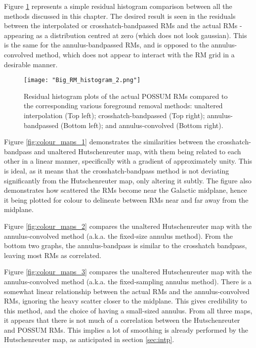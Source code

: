 Figure \ref{fig:big_hist} represents a simple residual histogram comparison between all the methods discussed in this chapter. The desired result is seen in the residuals between the interpolated or crosshatch-bandpassed RMs and the actual RMs - appearing as a distribution centred at zero (which does not look gaussian). This is the same for the annulus-bandpassed RMs, and is opposed to the annulus-convolved method, which does not appear to interact with the RM grid in a desirable manner.

\begin{figure}
    \texttt{[image: "Big\_RM\_histogram\_2.png"]}
    \centering
    \caption{Residual histogram plots of the actual POSSUM RMs compared to the corresponding various foreground removal methods: unaltered interpolation (Top left); crosshatch-bandpassed (Top right); annulus-bandpassed (Bottom left); and annulus-convolved (Bottom right).}
    \label{fig:big_hist}
\end{figure}


Figure \ref{fig:colour_maps_1} demonstrates the similarities between the crosshatch-bandpass and unaltered Hutschenreuter map, with them being related to each other in a linear manner, specifically with a gradient of approximately unity. This is ideal, as it means that the crosshatch-bandpass method is not deviating significantly from the Hutschenreuter map, only altering it subtly. The figure also demonstrates how scattered the RMs become near the Galactic midplane, hence it being plotted for colour to delineate between RMs near and far away from the midplane.

Figure \ref{fig:colour_maps_2} compares the unaltered Hutschenreuter map with the annulus-convolved method (a.k.a. the fixed-size annulus method). From the bottom two graphs, the annulus-bandpass is similar to the crosshatch bandpass, leaving most RMs as correlated.


Figure \ref{fig:colour_maps_3} compares the unaltered Hutschenreuter map with the annulus-convolved method (a.k.a. the fixed-sampling annulus method). There is a somewhat linear relationship between the actual RMs and the annulus-convolved RMs, ignoring the heavy scatter closer to the midplane. This gives credibility to this method, and the choice of having a small-sized annulus. From all three maps, it appears that there is not much of a correlation between the Hutschenreuter and POSSUM RMs. This implies a lot of smoothing is already performed by the Hutschenreuter map, as anticipated in section \ref{sec:intp}.


